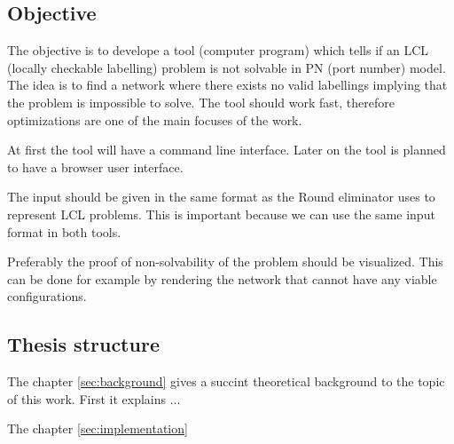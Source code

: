 \subsection*{Objective} %
The objective is to develope a tool (computer program) which tells if an LCL (locally checkable labelling) problem is not solvable in PN (port number) model.
The idea is to find a network where there exists no valid labellings implying that the problem is impossible to solve.
The tool should work fast, therefore optimizations are one of the main focuses of the work.

At first the tool will have a command line interface.
Later on the tool is planned to have a browser user interface.

The input should be given in the same format as the Round eliminator uses to represent LCL problems.
This is important because we can use the same input format in both tools.

Preferably the proof of non-solvability of the problem should be visualized.
This can be done for example by rendering the network that cannot have any viable configurations.

\subsection{Thesis structure}
The chapter \ref{sec:background} gives a succint theoretical background to the topic of this work.
First it explains ... %

The chapter \ref{sec:implementation}

